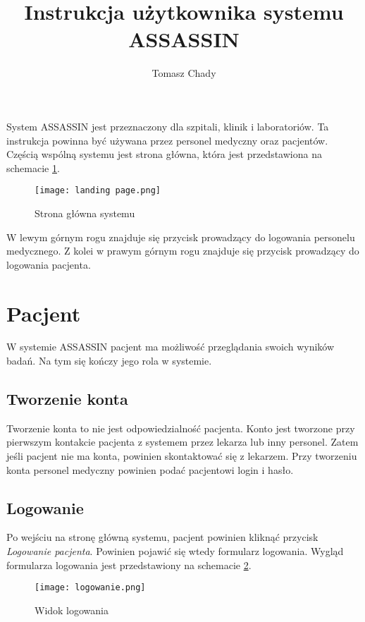 \documentclass{documentation}
\title{Instrukcja użytkownika systemu ASSASSIN}
\author{Tomasz Chady}
\begin{document}
\maketitle

\tableofcontents

System ASSASSIN jest przeznaczony dla szpitali, klinik i laboratoriów.
Ta instrukcja powinna być używana przez personel medyczny oraz pacjentów.
Częścią wspólną systemu jest strona główna, która jest przedstawiona na schemacie \ref{fig:mainPage}.

\begin{figure}[h]
    \centering
    \texttt{[image: landing page.png]}
    \caption{Strona główna systemu\label{fig:mainPage}}
\end{figure}

W lewym górnym rogu znajduje się przycisk prowadzący do logowania personelu medycznego.
Z kolei w prawym górnym rogu znajduje się przycisk prowadzący do logowania pacjenta.


\section{Pacjent}

W systemie ASSASSIN pacjent ma możliwość przeglądania swoich wyników badań.
Na tym się kończy jego rola w systemie.

\subsection{Tworzenie konta}

Tworzenie konta to nie jest odpowiedzialność pacjenta.
Konto jest tworzone przy pierwszym kontakcie pacjenta z systemem przez lekarza lub inny personel.
Zatem jeśli pacjent nie ma konta, powinien skontaktować się z lekarzem.
Przy tworzeniu konta personel medyczny powinien podać pacjentowi login i hasło.

\subsection{Logowanie}

Po wejściu na stronę główną systemu, pacjent powinien kliknąć przycisk \textit{Logowanie pacjenta}.
Powinien pojawić się wtedy formularz logowania.
Wygląd formularza logowania jest przedstawiony na schemacie \ref{fig:login}.

\begin{figure}[h]
    \centering
    \texttt{[image: logowanie.png]}
    \caption{Widok logowania\label{fig:login}}
\end{figure}
\end{document}
